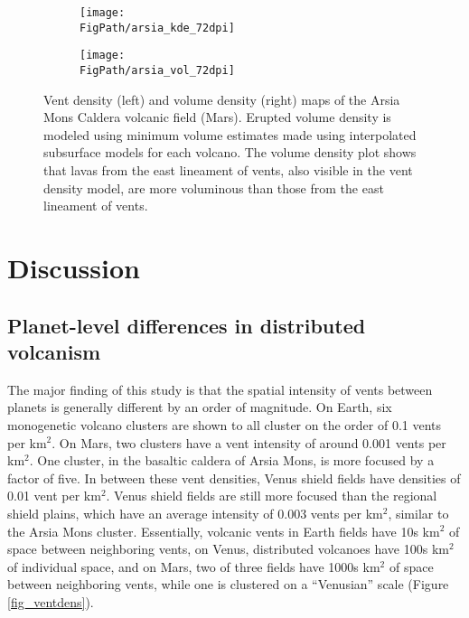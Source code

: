 \begin{figure}[h!]
    \centering
    \begin{subfigure}{0.49\textwidth}
        \centering
        \texttt{[image: \\FigPath/arsia\_kde\_72dpi]}
    \end{subfigure} 
    \begin{subfigure}{0.49\textwidth}
        \centering
        \texttt{[image: \\FigPath/arsia\_vol\_72dpi]}
    \end{subfigure}
    \caption[Vent density and volume density maps of the Arsia Mons Caldera volcanic field (Mars)]{Vent density (left) and volume density (right) maps of the Arsia Mons Caldera volcanic field (Mars). Erupted volume density is modeled using minimum volume estimates made using interpolated subsurface models for each volcano. The volume density plot shows that lavas from the east lineament of vents, also visible in the vent density model, are more voluminous than those from the east lineament of vents.}
\label{fig_arsia_kdevol}
\end{figure}

\section{Discussion}
\subsection{Planet-level differences in distributed volcanism}
The major finding of this study is that the spatial intensity of vents between planets is generally different by an order of magnitude. On Earth, six monogenetic volcano clusters are shown to all cluster on the order of 0.1 vents per km$^2$. On Mars, two clusters have a vent intensity of around 0.001 vents per km$^2$. One cluster, in the basaltic caldera of Arsia Mons, is more focused by a factor of five. In between these vent densities, Venus shield fields have densities of 0.01 vent per km$^2$. Venus shield fields are still more focused than the regional shield plains, which have an average intensity of 0.003 vents per km$^2$, similar to the Arsia Mons cluster. Essentially, volcanic vents in Earth fields have 10s km$^2$ of space between neighboring vents, on Venus, distributed volcanoes have 100s km$^2$ of individual space, and on Mars, two of three fields have 1000s  km$^2$ of space between neighboring vents, while one is clustered on a ``Venusian'' scale (Figure \ref{fig_ventdens}).


